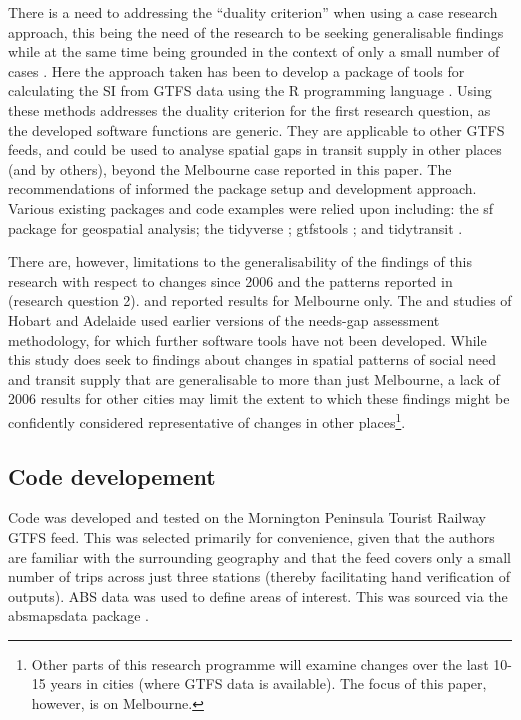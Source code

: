 \documentclass[preprint, 3p,
authoryear]{elsarticle} %
\begin{document}
There is a need to addressing the ``duality criterion'' when using a
case research approach, this being the need of the research to be
seeking generalisable findings while at the same time being grounded in
the context of only a small number of cases
\citep{Denscombe2007aa, Ketokivi2014aa}. Here the approach taken has
been to develop a package of tools for calculating the SI from GTFS data
using the R programming language \citep{R-base}. Using these methods
addresses the duality criterion for the first research question, as the
developed software functions are generic. They are applicable to other
GTFS feeds, and could be used to analyse spatial gaps in transit supply
in other places (and by others), beyond the Melbourne case reported in
this paper. The recommendations of \citet{wickham2023r} informed the
package setup and development approach. Various existing packages and
code examples were relied upon including: the sf package \citep{R-sf}
for geospatial analysis; the tidyverse \citep{tidyverse2019}; gtfstools
\citep{R-gtfstools}; and tidytransit \citep{R-tidytransit}.

There are, however, limitations to the generalisability of the findings
of this research with respect to changes since 2006 and the patterns
reported in \citet{currie2010identifying}(research question 2).
\citet{Currie2007Identifying} and \citet{currie2010identifying} reported
results for Melbourne only. The \citet{Currie2003Hobart} and
\citet{Currie2004Gap} studies of Hobart and Adelaide used earlier
versions of the needs-gap assessment methodology, for which further
software tools have not been developed. While this study does seek to
findings about changes in spatial patterns of social need and transit
supply that are generalisable to more than just Melbourne, a lack of
2006 results for other cities may limit the extent to which these
findings might be confidently considered representative of changes in
other places\footnote{Other parts of this research programme will
  examine changes over the last 10-15 years in cities (where GTFS data
  is available). The focus of this paper, however, is on Melbourne.}.

\subsection{Code developement}\label{code-developement}

Code was developed and tested on the Mornington Peninsula Tourist
Railway GTFS feed. This was selected primarily for convenience, given
that the authors are familiar with the surrounding geography and that
the feed covers only a small number of trips across just three stations
(thereby facilitating hand verification of outputs). ABS data was used
to define areas of interest. This was sourced via the absmapsdata
package \citep{absmapsdata}.
\end{document}
